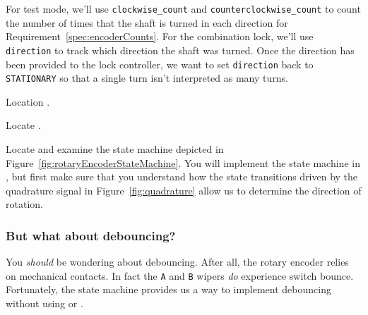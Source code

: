 For test mode, we'll use \lstinline{clockwise_count} and \lstinline{counterclockwise_count} to count the number of times that the shaft is turned in each direction for Requirement~\ref{spec:encoderCounts}.
For the combination lock, we'll use \lstinline{direction} to track which direction the shaft was turned.
Once the direction has been provided to the lock controller, we want to set \lstinline{direction} back to \lstinline{STATIONARY} so that a single turn isn't interpreted as many turns.

Location .
\begin{description}
\end{description}

Locate .
\begin{description}
\end{description}

Locate  and examine the state machine depicted in Figure~\ref{fig:rotaryEncoderStateMachine}.
You will implement the state machine in ,
but first make sure that you understand how the state transitions driven by the quadrature signal in Figure~\ref{fig:quadrature} allow us to determine the direction of rotation.

\subsubsection*{But what about debouncing?}

You \textit{should} be wondering about debouncing.
After all, the rotary encoder relies on mechanical contacts.
In fact the \texttt{A} and \texttt{B} wipers \textit{do} experience switch bounce.
Fortunately, the state machine provides us a way to implement debouncing without using  or .

